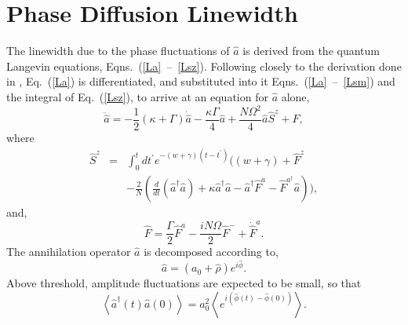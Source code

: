 \documentclass[aps,
twocolumn,
superscriptaddress,groupedaddress]{revtex4}
\begin{document}
\section{Phase Diffusion Linewidth}
\label{HakenAppendix}

The linewidth due to the phase fluctuations of $\hat{a}$ is derived from the quantum Langevin equations, Eqns.~(\ref{La}~--~\ref{Lsz}). Following closely to the derivation done in \cite{HakenLaser,
HakenLaserBook}, Eq.~(\ref{La}) is differentiated, and substituted into
it Eqns.~(\ref{La}~--~\ref{Lsm}) and the integral of Eq.~(\ref{Lsz}), to
arrive at an equation for $\hat{a}$ alone,
\begin{equation}
\ddot{\hat{a}} =
-\frac{1}{2} (\kappa+\Gamma)  \dot{\hat{a}} -
\frac{\kappa \Gamma}{4}\hat{a}  +
\frac{N \Omega^2 }{4} \hat{a} \hat{S}^z +\hat{F},
\label{addeq}
\end{equation}
where
\begin{eqnarray}
\hat{S}^z &=&
\int_0^t dt^{\prime} e^{-(w+\gamma)(t-t^{\prime})}
\bigg( (w+\gamma) + \hat{F}^z
\nonumber
\\
&&-\frac{2}{N} \left( \frac{d}{dt} (\hat{a}^{\dagger} \hat{a}) +
\kappa \hat{a}^{\dagger} \hat{a} -\hat{a}^{\dagger} \hat{F}^a -
\hat{F}^{a^{\dagger}} \hat{a} \right) \bigg),
\end{eqnarray}
and,
\begin{equation}
\hat{F} = \frac{\Gamma}{2} \hat{F}^a-
\frac{i N \Omega}{2} \hat{F}^-+\dot{\hat{F}}^a.
\end{equation}
The annihilation operator $\hat{a}$ is decomposed according to,
\begin{equation}
\hat{a}= (a_0 + \hat{\rho}) e^{i\hat{\phi}}.
\label{adecomp}
\end{equation}
Above threshold, amplitude fluctuations are expected to be small, so that
\begin{equation}
\left< \hat{a}^{\dagger}(t) \hat{a}(0) \right> =
a_0^2 \left< e^{i(\hat{\phi}(t) - \hat{\phi}(0))} \right>.
\end{equation}
\end{document}
